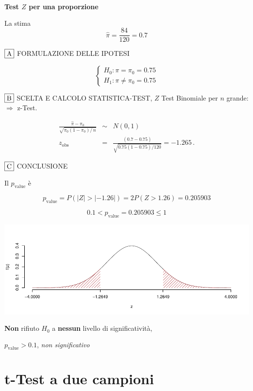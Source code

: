 \documentclass[
  11pt,
]{book}
\theoremstyle{mytheoremstyle}
\theoremstyle{mydefstyle}
\newenvironment{sol}
  {
  \begin{tcolorbox}[enhanced,breakable,arc=0.1mm,boxrule=1pt,colback=white,colframe=iblue,
  title=\bf \fontfamily{lmss}\selectfont \hspace{.5 cm} Soluzione,drop fuzzy shadow]

}{
\end{tcolorbox}
  }
\begin{document}
\begin{sol}
\textbf{Test \(Z\) per una proporzione}

La stima
\[\hat\pi=\frac { 84 } { 120 }= 0.7  \]

\(\fbox{A}\) FORMULAZIONE DELLE IPOTESI

\[\begin{cases}
   H_0: \pi = \pi_0=0.75 \\
   H_1: \pi \neq \pi_0=0.75 
   \end{cases}\]

\(\fbox{B}\) SCELTA E CALCOLO STATISTICA-TEST, \(Z\)
Test Binomiale per \(n\) grande: \(\Rightarrow\) z-Test.

\begin{eqnarray*}
   \frac{\hat\pi - \pi_{0}} {\sqrt {\pi_0(1-\pi_0)/\,n}}&\sim&N(0,1)\\
   z_{\text{obs}}
   &=& \frac{ ( 0.7 -  0.75 )} {\sqrt{ 0.75 (1- 0.75 )/ 120 }}
   =   -1.265 \,.
   \end{eqnarray*}

\(\fbox{C}\) CONCLUSIONE

Il \(p_{\text{value}}\) è

\[ p_{\text{value}} = P(|Z|>|-1.26|)=2P(Z>1.26)=0.205903 \]

\[
 0.1 < p_\text{value}= 0.205903 \leq 1 
\]

\begin{center}\includegraphics{Esami_passati_con_soluzioni_files/figure-latex/05-test-23-1} \end{center}

\textbf{Non} rifiuto \(H_0\) a \textbf{nessun}
livello di significatività,

\(p_\text{value}>0.1\),
\emph{non significativo}

\end{sol}

\section{t-Test a due campioni}\label{t-test-a-due-campioni}
\end{document}
